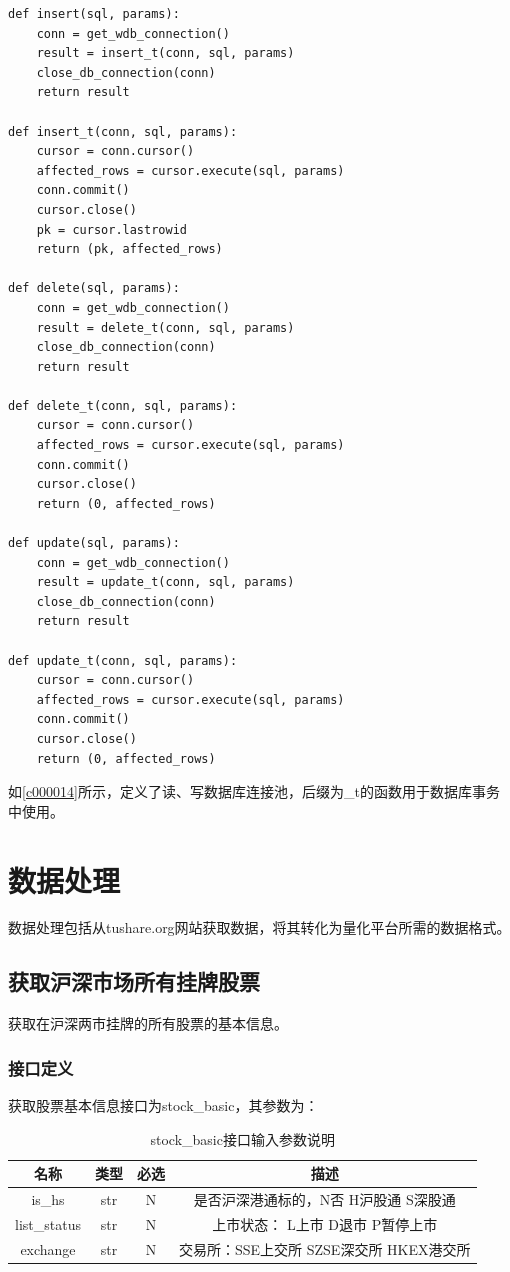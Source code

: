 \documentclass{article}
\begin{document}
\begin{lstlisting}
def insert(sql, params):
    conn = get_wdb_connection()
    result = insert_t(conn, sql, params)
    close_db_connection(conn)
    return result

def insert_t(conn, sql, params):
    cursor = conn.cursor()
    affected_rows = cursor.execute(sql, params)
    conn.commit()
    cursor.close()
    pk = cursor.lastrowid
    return (pk, affected_rows)
    
def delete(sql, params):
    conn = get_wdb_connection()
    result = delete_t(conn, sql, params)
    close_db_connection(conn)
    return result
    
def delete_t(conn, sql, params):
    cursor = conn.cursor()
    affected_rows = cursor.execute(sql, params)
    conn.commit()
    cursor.close()
    return (0, affected_rows)
    
def update(sql, params):
    conn = get_wdb_connection()
    result = update_t(conn, sql, params)
    close_db_connection(conn)
    return result
    
def update_t(conn, sql, params):
    cursor = conn.cursor()
    affected_rows = cursor.execute(sql, params)
    conn.commit()
    cursor.close()
    return (0, affected_rows)
\end{lstlisting}
如\ref{c000014}所示，定义了读、写数据库连接池，后缀为\_t的函数用于数据库事务中使用。




\section{数据处理}
数据处理包括从tushare.org网站获取数据，将其转化为量化平台所需的数据格式。
\subsection{获取沪深市场所有挂牌股票}
获取在沪深两市挂牌的所有股票的基本信息。
\subsubsection{接口定义}
获取股票基本信息接口为stock\_basic，其参数为：

\begin{table}[H]
\caption{stock\_basic接口输入参数说明}
\label{t000001}
\begin{tabular}{|c|c|c|c|} \hline
名称 & 类型 & 必选 & 描述 \\ \hline  
is\_hs & str & N & 是否沪深港通标的，N否 H沪股通 S深股通 \\ \hline
list\_status & str & N & 上市状态： L上市 D退市 P暂停上市 \\ \hline
exchange & str & N & 交易所：SSE上交所 SZSE深交所 HKEX港交所 \\ \hline
\end{tabular}
\end{table}
\end{document}
